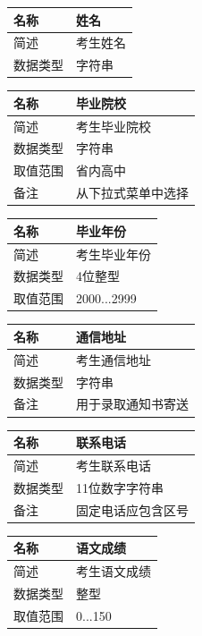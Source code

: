 \documentclass[CJK,utf8]{ctexrep}
\begin{document}
\begin{tabularx}{0.85\textwidth}{|l|X|}
	\hline
	\textbf{名称} & \textbf{姓名} \\
	\hline
	简述 & 考生姓名 \\
	\hline
	数据类型 & 字符串 \\
	\hline
\end{tabularx}

\begin{tabularx}{0.85\textwidth}{|l|X|}
	\hline
	\textbf{名称} & \textbf{毕业院校} \\
	\hline
	简述 & 考生毕业院校 \\
	\hline
	数据类型 & 字符串 \\
	\hline
	取值范围 & 省内高中 \\
	\hline
	备注 & 从下拉式菜单中选择 \\
	\hline
\end{tabularx}

\begin{tabularx}{0.85\textwidth}{|l|X|}
	\hline
	\textbf{名称} & \textbf{毕业年份} \\
	\hline
	简述 & 考生毕业年份 \\
	\hline
	数据类型 & 4位整型 \\
	\hline
	取值范围 & 2000...2999 \\
	\hline
\end{tabularx}

\begin{tabularx}{0.85\textwidth}{|l|X|}
	\hline
	\textbf{名称} & \textbf{通信地址} \\
	\hline
	简述 & 考生通信地址 \\
	\hline
	数据类型 & 字符串 \\
	\hline
	备注 & 用于录取通知书寄送 \\
	\hline
\end{tabularx}

\begin{tabularx}{0.85\textwidth}{|l|X|}
	\hline
	\textbf{名称} & \textbf{联系电话} \\
	\hline
	简述 & 考生联系电话 \\
	\hline
	数据类型 & 11位数字字符串 \\
	\hline
	备注 & 固定电话应包含区号 \\
	\hline
\end{tabularx}

\begin{tabularx}{0.85\textwidth}{|l|X|}
	\hline
	\textbf{名称} & \textbf{语文成绩} \\
	\hline
	简述 & 考生语文成绩 \\
	\hline
	数据类型 & 整型 \\
	\hline
	取值范围 & 0...150 \\
	\hline
\end{tabularx}
\end{document}
